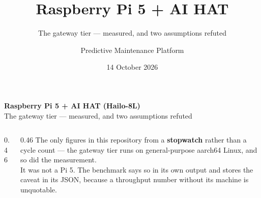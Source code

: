 \documentclass[aspectratio=169,10pt]{beamer}
\title[Pi 5 gateway]{Raspberry Pi 5 + AI HAT}
\subtitle{The gateway tier --- measured, and two assumptions refuted}
\author{Predictive Maintenance Platform}
\date{14 October 2026}
\begin{document}
\begin{frame}[plain]
  \vspace{5mm}
  {\LARGE\bfseries Raspberry Pi 5 + AI HAT (Hailo-8L)}\\[2mm]
  {\large\color{pdmink2} The gateway tier --- measured, and two assumptions
   refuted}\par
  \vspace{5mm}\noindent{\color{pdmrule}\rule{\linewidth}{0.4pt}}\par
  \vspace{3mm}
  \begin{columns}[T]
    \begin{column}{0.46\textwidth}
      \scriptsize
      \\[1mm]
      \\[1mm]
      \\[1mm]
      \\[1mm]
      \\[1mm]
    \end{column}
    \begin{column}{0.46\textwidth}
      \scriptsize\color{pdmink2}
      The only figures in this repository from a \textbf{stopwatch} rather than
      a cycle count --- the gateway tier runs on general-purpose aarch64 Linux,
      and so did the measurement.
      \\[2mm]
      It was not a Pi 5. The benchmark says so in its own output and stores the
      caveat in its JSON, because a throughput number without its machine is
      unquotable.
    \end{column}
  \end{columns}
\end{frame}
\end{document}
